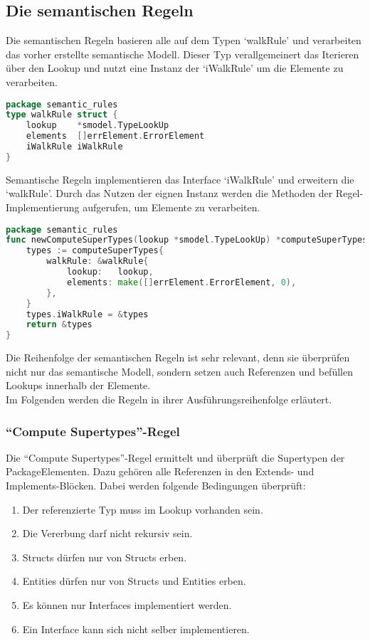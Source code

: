 \documentclass[./einleitung.tex]{subfiles}
\begin{document}
    \subsection{Die semantischen Regeln}\label{subsec:die-semantischen-regeln}
    Die semantischen Regeln basieren alle auf dem Typen `walkRule' und verarbeiten das vorher erstellte semantische Modell.
    Dieser Typ verallgemeinert das Iterieren über den Lookup und nutzt eine Instanz der `iWalkRule' um die Elemente zu verarbeiten.
    \begin{lstlisting}[language=go, caption=Definition der walkRule, label=lst:walkRule]
package semantic_rules
type walkRule struct {
	lookup    *smodel.TypeLookUp
	elements  []errElement.ErrorElement
	iWalkRule iWalkRule
}
    \end{lstlisting}
    Semantische Regeln implementieren das Interface `iWalkRule' und erweitern die `walkRule'.
    Durch das Nutzen der eignen Instanz werden die Methoden der Regel-Implementierung aufgerufen, um Elemente zu verarbeiten.
    \begin{lstlisting}[language=go, caption=Konstruktor der ``Compute Supertypes''-Regel, label=lst:newComputeSuperTypes]
package semantic_rules
func newComputeSuperTypes(lookup *smodel.TypeLookUp) *computeSuperTypes {
	types := computeSuperTypes{
		walkRule: &walkRule{
			lookup:   lookup,
			elements: make([]errElement.ErrorElement, 0),
		},
	}
    types.iWalkRule = &types
    return &types
}\end{lstlisting}

    Die Reihenfolge der semantischen Regeln ist sehr relevant, denn sie überprüfen nicht nur das semantische Modell, sondern setzen auch Referenzen und befüllen Lookups innerhalb der Elemente. \\
    Im Folgenden werden die Regeln in ihrer Ausführungsreihenfolge erläutert.

    \subsubsection{``Compute Supertypes''-Regel}
    Die ``Compute Supertypes''-Regel ermittelt und überprüft die Supertypen der PackageElementen.
    Dazu gehören alle Referenzen in den Extends- und Implements-Blöcken.
    Dabei werden folgende Bedingungen überprüft:
    \begin{enumerate}
        \item Der referenzierte Typ muss im Lookup vorhanden sein.
        \item Die Vererbung darf nicht rekursiv sein.
        \item Structs dürfen nur von Structs erben.
        \item Entities dürfen nur von Structs und Entities erben.
        \item Es können nur Interfaces implementiert werden.
        \item Ein Interface kann sich nicht selber implementieren.
    \end{enumerate}
\end{document}
